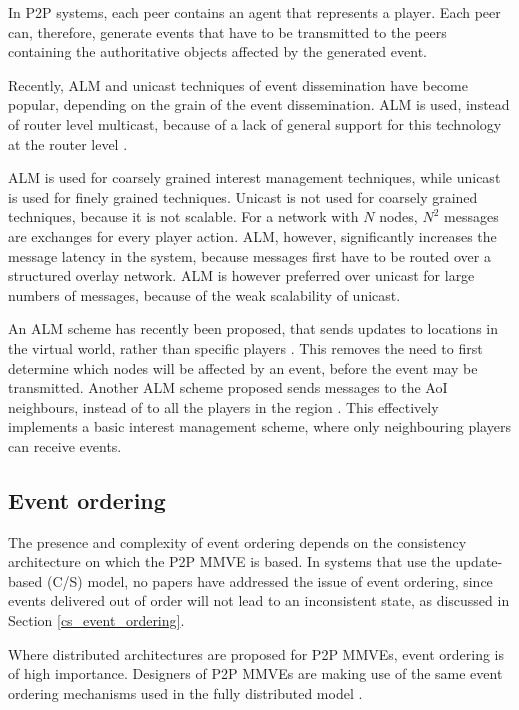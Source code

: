 In P2P systems, each peer contains an agent that represents a player. Each peer can, therefore, generate events that have to be transmitted to the peers containing the authoritative objects affected by the generated event.

Recently, ALM and unicast techniques of event dissemination have become popular, depending on the grain of the event dissemination. ALM is used, instead of router level multicast, because of a lack of general support for this technology at the router level \cite{ip_multicast_deployment_issues}.

ALM is used for coarsely grained interest management techniques, while unicast is used for finely grained techniques. Unicast is not used for
coarsely grained techniques, because it is not scalable. For a network with $N$ nodes, $N^2$ messages are exchanges for every player action. ALM,
however, significantly increases the message latency in the system, because messages first have to be routed over a structured overlay network. ALM
is however preferred over unicast for large numbers of messages, because of the weak scalability of unicast.

An ALM scheme has recently been proposed, that sends updates to locations in the virtual world, rather than specific players
\cite{Ghaffari_Delaunay_churn_mobility}. This removes the need to first determine which nodes will be affected by an event, before the event may be
transmitted. Another ALM scheme proposed sends messages to the AoI neighbours, instead of to all the players in the region
\cite{Seeger_area_based_gossip_multicast}. This effectively implements a basic interest management scheme, where only neighbouring players can
receive events.

\subsection{Event ordering}

The presence and complexity of event ordering depends on the consistency architecture on which the P2P MMVE is based. In systems that use the update-based (C/S) model, no papers have addressed the issue of event ordering, since events delivered out of order will not lead to an inconsistent state, as discussed in Section \ref{cs_event_ordering}.

Where distributed architectures are proposed for P2P MMVEs, event ordering is of high importance. Designers of P2P MMVEs are making use of the same event ordering mechanisms used in the fully distributed model \cite{hybrid_storage1}.

